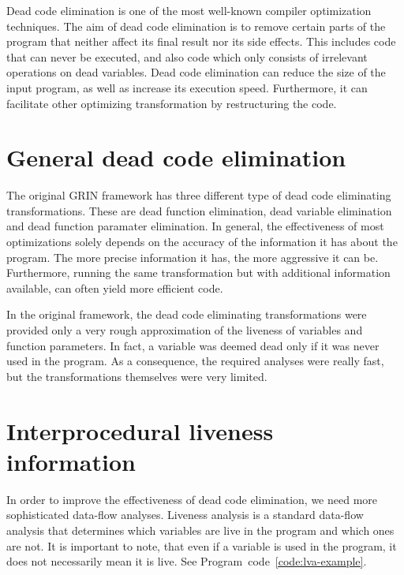 \documentclass[main.tex]{subfiles}
\begin{document}
	
	Dead code elimination is one of the most well-known compiler optimization techniques. The aim of dead code elimination is to remove certain parts of the program that neither affect its final result nor its side effects. This includes code that can never be executed, and also code which only consists of irrelevant operations on dead variables. Dead code elimination can reduce the size of the input program, as well as increase its execution speed. Furthermore, it can facilitate other optimizing transformation by restructuring the code.
	
	\section{General dead code elimination}
	
	The original GRIN framework has three different type of dead code eliminating transformations. These are dead function elimination, dead variable elimination and dead function paramater elimination. In general, the effectiveness of most optimizations solely depends on the accuracy of the information it has about the program. The more precise information it has, the more aggressive it can be. Furthermore, running the same transformation but with additional information available, can often yield more efficient code.
	
	In the original framework, the dead code eliminating transformations were provided only a very rough approximation of the liveness of variables and function parameters. In fact, a variable was deemed dead only if it was never used in the program. As a consequence, the required analyses were really fast, but the transformations themselves were very limited.
	
	\section{Interprocedural liveness information} \label{sub-sec:lva}
	
	In order to improve the effectiveness of dead code elimination, we need more sophisticated data-flow analyses. Liveness analysis is a standard data-flow analysis that determines which variables are live in the program and which ones are not. It is important to note, that even if a variable is used in the program, it does not necessarily mean it is live. See Program~code~\ref{code:lva-example}.
	
\end{document}
